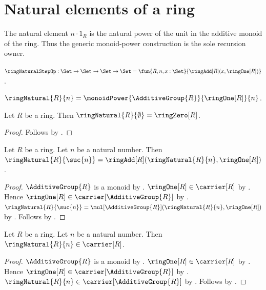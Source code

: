 



\section{Natural elements of a ring}

The natural element $n\cdot 1_R$ is the natural power of the unit in the
additive monoid of the ring.  Thus the generic monoid-power construction is
the sole recursion owner.

\begin{definition}\label{ring_natural_step}
    $\ringNaturalStepOp:\Set\to\Set\to\Set\to\Set
        =\fun{R,n,x:\Set}{
            \ringAdd[R](x,\ringOne[R])}$.
\end{definition}

\begin{definition}\label{ring_natural}
    $\ringNatural{R}{n}=
        \monoidPower{\AdditiveGroup{R}}{\ringOne[R]}{n}$.
\end{definition}

\begin{proposition}\label{ring_natural_zero}
    Let $R$ be a ring.
    Then $\ringNatural{R}{\emptyset}=\ringZero[R]$.
\end{proposition}
\begin{proof}
    Follows by
        .
\end{proof}

\begin{proposition}\label{ring_natural_successor}
    Let $R$ be a ring.
    Let $n$ be a natural number.
    Then $\ringNatural{R}{\suc{n}}
        =\ringAdd[R](\ringNatural{R}{n},\ringOne[R])$.
\end{proposition}
\begin{proof}
    $\AdditiveGroup{R}$ is a monoid by
        .
    $\ringOne[R]\in\carrier[R]$ by .
    Hence $\ringOne[R]\in\carrier[\AdditiveGroup{R}]$ by
        .
    $\ringNatural{R}{\suc{n}}=
        \mul[\AdditiveGroup{R}](
            \ringNatural{R}{n},\ringOne[R])$ by
        .
    Follows by .
\end{proof}

\begin{proposition}\label{ring_natural_type}
    Let $R$ be a ring.
    Let $n$ be a natural number.
    Then $\ringNatural{R}{n}\in\carrier[R]$.
\end{proposition}
\begin{proof}
    $\AdditiveGroup{R}$ is a monoid by
        .
    $\ringOne[R]\in\carrier[R]$ by .
    Hence $\ringOne[R]\in\carrier[\AdditiveGroup{R}]$ by
        .
    $\ringNatural{R}{n}\in\carrier[\AdditiveGroup{R}]$ by
        .
    Follows by .
\end{proof}

